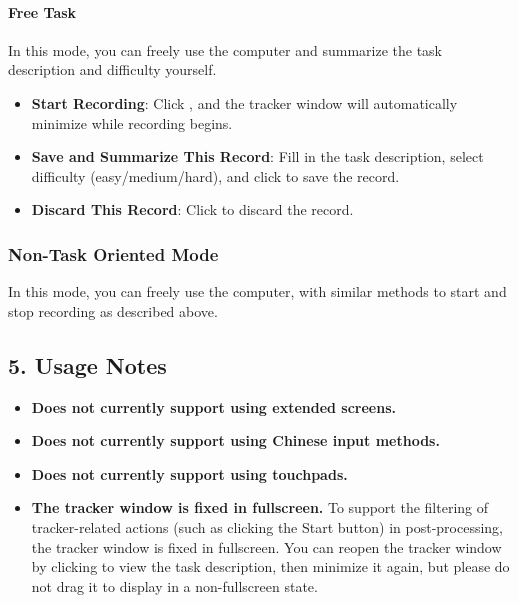 \documentclass{article} %
\begin{document}
\paragraph{Free Task}  
In this mode, you can freely use the computer and summarize the task description and difficulty yourself.
\begin{itemize}[itemsep=0pt]
    \item \textbf{Start Recording}: Click , and the tracker window will automatically minimize while recording begins.
    \item \textbf{Save and Summarize This Record}: 
    Fill in the task description, select difficulty (easy/medium/hard), and click  to save the record.
    \item \textbf{Discard This Record}: Click  to discard the record.
\end{itemize}

\subsubsection*{Non-Task Oriented Mode}

In this mode, you can freely use the computer, with similar methods to start and stop recording as described above.

\subsection*{5. Usage Notes}
\begin{itemize}[itemsep=0pt]
    \item \textbf{Does not currently support using extended screens.}
    \item \textbf{Does not currently support using Chinese input methods.}
    \item \textbf{Does not currently support using touchpads.}
    \item \textbf{The tracker window is fixed in fullscreen.} To support the filtering of tracker-related actions (such as clicking the Start button) in post-processing, the tracker window is fixed in fullscreen. You can reopen the tracker window by clicking to view the task description, then minimize it again, but please do not drag it to display in a non-fullscreen state.

\end{itemize}
\end{document}
